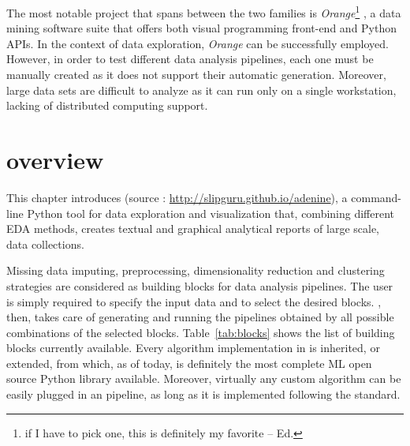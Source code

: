 The most notable project that spans between the two families is \emph{Orange}\footnote{if I have to pick one, this is definitely my favorite -- Ed.} \cite{demvsar2013orange}, a data mining software suite that offers both visual programming front-end and Python \ac{API}s. In the context of data exploration, \emph{Orange} can be successfully employed. However, in order to test different data analysis pipelines, each one must be manually created as it does not support their automatic generation.
Moreover, large data sets are difficult to analyze as it can run only on a single workstation, lacking of distributed computing support.

\section{\ade overview} \label{sec:adenine_overview}

This chapter introduces \ade (source : \url{http://slipguru.github.io/adenine}), a command-line Python tool for data exploration and visualization that, combining different EDA methods, creates textual and graphical analytical reports of large scale, data collections.



Missing data imputing, preprocessing, dimensionality reduction and clustering strategies are considered as building blocks for data analysis pipelines. The user is simply required to specify the input data and to select the desired blocks. \ade, then, takes care of generating and running the pipelines obtained by all possible combinations of the selected blocks.
Table~\ref{tab:blocks} shows the list of building blocks currently available.
Every algorithm implementation in \ade is inherited, or extended, from \sklearn \cite{scikit-learn} which, as of today, is definitely the most complete ML open source Python library available.
Moreover, virtually any custom algorithm can be easily plugged in an \ade pipeline, as long as it is implemented following the \sklearn standard.


